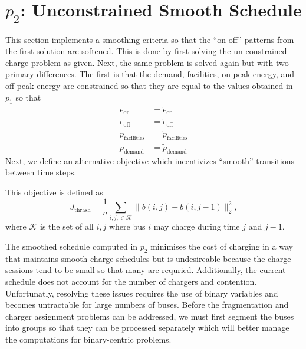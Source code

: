 \section{$p_2$: Unconstrained Smooth Schedule \label{sec:unconstrainedSmoothSchedule}} 
\par This section implements a smoothing criteria so that the ``on-off'' patterns from the first solution are softened. This is done by first solving the un-constrained charge problem as given. Next, the same problem is solved again but with two primary differences. The first is that the demand, facilities, on-peak energy, and off-peak energy are constrained so that they are equal to the values obtained in $p_1$ so that
\begin{equation}\label{eqn:unconstrainedSmooth:equivalence}\begin{aligned}
	e_{\text{on}} &= \tilde{e}_{\text{on}} \\
	e_{\text{off}} &= \tilde{e}_{\text{off}} \\
	p_{\text{facilities}} &= \tilde{p}_{\text{facilities}} \\
	p_{\text{demand}} &= \tilde{p}_{\text{demand}}
\end{aligned}\end{equation}
Next, we define an alternative objective which incentivizes ``smooth'' transitions between time steps. 
\par This objective is defined as
\begin{equation}\label{eqn:objective:smooth}
	J_{\text{thrash}} = \frac{1}{n}\sum_{i,j, \in \mathcal{K}}\lVert b(i,j) - b(i,j-1) \rVert^2_2,
\end{equation}
where $\mathcal{K}$ is the set of all $i,j$ where bus $i$ may charge during time $j$ and $j - 1$.
\par The smoothed schedule computed in $p_2$ minimises the cost of charging in a way that maintains smooth charge schedules but is undesireable because the charge sessions tend to be small so that many are requried. Additionally, the current schedule does not account for the number of chargers and contention. Unfortunatly, resolving these issues requires the use of binary variables and becomes untractable for large numbers of buses. Before the fragmentation and charger assignment problems can be addressed, we must first segment the buses into groups so that they can be processed separately which will better manage the computations for binary-centric problems.
\\[0.1in]  

